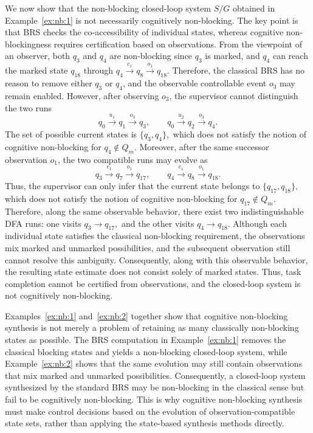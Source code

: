 \documentclass[journal,twoside,web]{ieeecolor}
\begin{document}
\begin{example}\label{ex:nb:2}
We now show that the non-blocking closed-loop system $S/G$ obtained in Example~\ref{ex:nb:1} is not necessarily cognitively non-blocking. 
The key point is that BRS checks the co-accessibility of individual states, whereas cognitive non-blockingness requires certification based on observations.
%
From the viewpoint of an observer, both $q_3$ and $q_4$ are non-blocking since $q_3$ is marked, and $q_4$ can reach the marked state $q_{18}$ through
$
    q_4 \xrightarrow{c_1}q_8 \xrightarrow{o_1}q_{18}.
$
%
Therefore, the classical BRS has no reason to remove either $q_3$ or $q_4$, and the observable controllable event $o_3$ may remain enabled.
%
However, after observing $o_3$, the supervisor cannot distinguish the two runs
$$
    q_0\xrightarrow{u_1}q_1\xrightarrow{o_3}q_3,
    \qquad
    q_0\xrightarrow{u_2}q_2\xrightarrow{o_3}q_4 .
$$
The set of possible current states is
$
    \{q_3, q_4\},
$
which does not satisfy the notion of cognitive non-blocking for $q_4 \not \in Q_m$.
%
Moreover, after the same successor observation $o_1$, the two compatible runs may evolve as
$$
    q_3 \xrightarrow{c_1}q_7 \xrightarrow{o_1}q_{17},
    \qquad
    q_4 \xrightarrow{c_1}q_8 \xrightarrow{o_1}q_{18}.
$$
Thus, the supervisor can only infer that the current state belongs to
$
    \{q_{17},q_{18}\},
$
which does not satisfy the notion of cognitive non-blocking for $q_{17} \not \in Q_m$.
%
Therefore, along the same observable behavior, there exist two indistinguishable DFA runs: one visits
$
    q_3 \longrightarrow q_{17},
$
and the other visits
$
    q_4 \longrightarrow q_{18}.
$
Although each individual state satisfies the classical non-blocking requirement, the observations mix marked and unmarked possibilities, and the subsequent observation still cannot resolve this ambiguity.
Consequently, along with this observable behavior, the resulting state estimate does not consist solely of marked states. 
Thus, task completion cannot be certified from observations, and the closed-loop system is not cognitively non-blocking.
\end{example}


Examples~\ref{ex:nb:1} and~\ref{ex:nb:2} together show that cognitive non-blocking synthesis is not merely a problem of retaining as many classically non-blocking states as possible. 
The BRS computation in Example~\ref{ex:nb:1} removes the classical blocking states and yields a non-blocking closed-loop system, while Example~\ref{ex:nb:2} shows that the same evolution may still contain observations that mix marked and unmarked possibilities. 
Consequently, a closed-loop system synthesized by the standard BRS may be non-blocking in the classical sense but fail to be cognitively non-blocking. 
This is why cognitive non-blocking synthesis must make control decisions based on the evolution of observation-compatible state sets, rather than applying the state-based synthesis methods directly.
\end{document}
